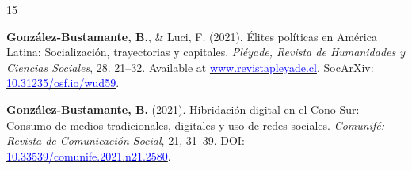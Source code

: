 \begin{publications}
\begin{benumerate}{15}

\item{{\bfseries González-Bustamante, B.}, \& Luci, F. (2021). Élites políticas en América Latina: Socialización, trayectorias y capitales. {\itshape Pléyade, Revista de Humanidades y Ciencias Sociales}, 28. 21--32. Available at \href{http://www.revistapleyade.cl/index.php/OJS/article/view/359}{\textcolor{blue}{www.revistapleyade.cl}}. SocArXiv: \href{https://doi.org/10.31235/osf.io/wud59}{\textcolor{blue}{10.31235/osf.io/wud59}}.}\vspace{1mm}


\item{{\bfseries González-Bustamante, B.} (2021).  Hibridación digital en el Cono Sur: Consumo de medios tradicionales, digitales y uso de redes sociales. {\itshape Comunifé: Revista de Comunicación Social}, 21, 31--39. DOI: \href{https://doi.org/10.33539/comunife.2021.n21.2580}{\textcolor{blue}{10.33539/comunife.2021.n21.2580}}.}\vspace{1mm} %



\end{benumerate}
\end{publications}
